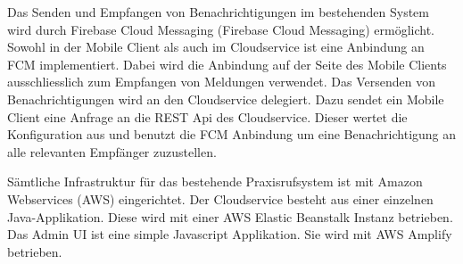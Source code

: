 Das Senden und Empfangen von Benachrichtigungen im bestehenden System wird durch Firebase Cloud Messaging (Firebase Cloud Messaging) ermöglicht.
Sowohl in der Mobile Client als auch im Cloudservice ist eine Anbindung an FCM implementiert.
Dabei wird die Anbindung auf der Seite des Mobile Clients ausschliesslich zum Empfangen von Meldungen verwendet.
Das Versenden von Benachrichtigungen wird an den Cloudservice delegiert.
Dazu sendet ein Mobile Client eine Anfrage an die REST Api des Cloudservice.
Dieser wertet die Konfiguration aus und benutzt die FCM Anbindung um eine Benachrichtigung an alle relevanten Empfänger zuzustellen.

Sämtliche Infrastruktur für das bestehende Praxisrufsystem ist mit Amazon Webservices (AWS) eingerichtet.
Der Cloudservice besteht aus einer einzelnen Java-Applikation.
Diese wird mit einer AWS Elastic Beanstalk Instanz betrieben.
Das Admin UI ist eine simple Javascript Applikation.
Sie wird mit AWS Amplify betrieben.\cite{ip5}

%
%
%
%
%
%
%
%
%
%
%

\clearpage

